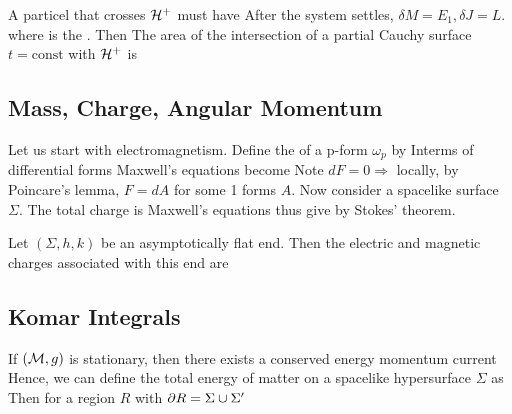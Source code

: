 \documentclass{article}
\begin{document}
A particel that crosses $\mathcal{H}^+$ must have 
After the system settles, $\delta M = E_1, \delta J = L$. 
where 
is the . Then 
The area of the intersection of a partial Cauchy surface $t=\text{const}$ with $\mathcal{H}^+$ is 
\subsection{Mass, Charge, Angular Momentum}
Let us start with electromagnetism. 
Define the  of a p-form $\omega_p$ by 
Interms of differential forms Maxwell's equations become
Note $dF = 0 \Rightarrow$ locally, by Poincare's lemma, $F = dA$ for some 1 forms $A$. Now consider a spacelike surface $\Sigma$. The total charge is 
Maxwell's equations thus give 
by Stokes' theorem. 

\begin{definition}
Let $(\Sigma,h,k)$ be an asymptotically flat end. Then the electric and magnetic charges associated with this end are 
\end{definition}

\subsection{Komar Integrals}
If $(\mathcal{M},g)$ is stationary, then there exists a conserved energy momentum current 
Hence, we can define the total energy of matter on a spacelike hypersurface $\Sigma$ as 
Then for a region $R$ with $\partial R = \Sigma \cup \Sigma^\prime$
\end{document}
